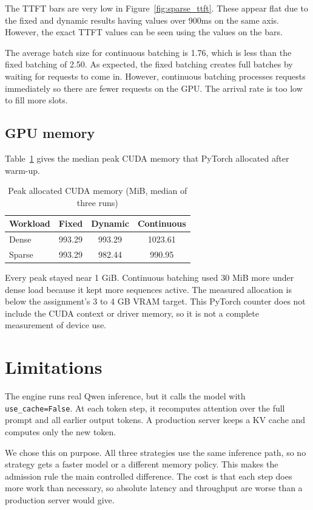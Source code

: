 \documentclass[12pt,a4paper]{article}
\begin{document}
The TTFT bars are very low in Figure~\ref{fig:sparse_ttft}. These appear flat due to the fixed and dynamic results having values over 900ms on the same axis. However, the exact TTFT values can be seen using the values on the bars.

The average batch size for continuous batching is 1.76, which is less than the fixed batching of 2.50. As expected, the fixed batching creates full batches by waiting for requests to come in. However, continuous batching processes requests immediately so there are fewer requests on the GPU. The arrival rate is too low to fill more slots.

\subsection{GPU memory}
Table~\ref{tab:mem} gives the median peak CUDA memory that PyTorch allocated after warm-up.

\begin{table}[H]
\centering
\caption{Peak allocated CUDA memory (MiB, median of three runs)}
\label{tab:mem}
\begin{tabular}{lccc}
\toprule
\textbf{Workload} & \textbf{Fixed} & \textbf{Dynamic} & \textbf{Continuous} \\
\midrule
Dense & 993.29 & 993.29 & 1023.61 \\
Sparse & 993.29 & 982.44 & 990.95 \\
\bottomrule
\end{tabular}
\end{table}

Every peak stayed near 1 GiB. Continuous batching used 30 MiB more under dense load because it kept more sequences active. The measured allocation is below the assignment's 3 to 4 GB VRAM target. This PyTorch counter does not include the CUDA context or driver memory, so it is not a complete measurement of device use.

\section{Limitations}
The engine runs real Qwen inference, but it calls the model with \texttt{use\_cache=False}. At each token step, it recomputes attention over the full prompt and all earlier output tokens. A production server keeps a KV cache and computes only the new token.

We chose this on purpose. All three strategies use the same inference path, so no strategy gets a faster model or a different memory policy. This makes the admission rule the main controlled difference. The cost is that each step does more work than necessary, so absolute latency and throughput are worse than a production server would give.
\end{document}

